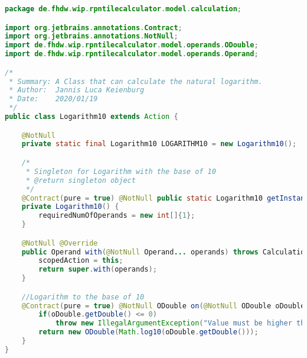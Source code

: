 \begin{lstlisting}[caption=Logarithm10 (Keienburg),label=list:Logarithm10,language=Java]
package de.fhdw.wip.rpntilecalculator.model.calculation;

import org.jetbrains.annotations.Contract;
import org.jetbrains.annotations.NotNull;
import de.fhdw.wip.rpntilecalculator.model.operands.ODouble;
import de.fhdw.wip.rpntilecalculator.model.operands.Operand;

/*
 * Summary: A Class that can calculate the natural logarithm.
 * Author:  Jannis Luca Keienburg
 * Date:    2020/01/19
 */
public class Logarithm10 extends Action {

    @NotNull
    private static final Logarithm10 LOGARITHM10 = new Logarithm10();

    /*
     * Singleton for Logarithm with the base of 10
     * @return singleton object
     */
    @Contract(pure = true) @NotNull public static Logarithm10 getInstance() { return LOGARITHM10; }
    private Logarithm10() {
        requiredNumOfOperands = new int[]{1};
    }

    @NotNull @Override
    public Operand with(@NotNull Operand... operands) throws CalculationException {
        scopedAction = this;
        return super.with(operands);
    }

    //Logarithm to the base of 10
    @Contract(pure = true) @NotNull ODouble on(@NotNull ODouble oDouble) {
        if(oDouble.getDouble() <= 0)
            throw new IllegalArgumentException("Value must be higher than Zero.");
        return new ODouble(Math.log10(oDouble.getDouble()));
    }
}
\end{lstlisting}  

